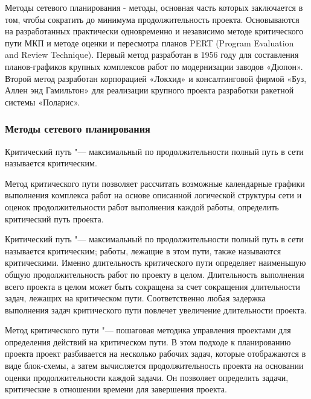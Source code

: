 \documentclass{../industrial-development}
\begin{document}
Методы сетевого планирования - методы, основная часть которых заключается в том, чтобы сократить до минимума продолжительность проекта. Основываются на разработанных практически одновременно и независимо методе критического пути МКП и методе оценки и пересмотра планов PERT (Program Evaluation and Review Technique). Первый метод разработан в 1956 году для составления планов-графиков крупных комплексов работ по модернизации заводов «Дюпон». Второй метод разработан корпорацией «Локхид» и консалтинговой фирмой «Буз, Аллен энд Гамильтон» для реализации крупного проекта разработки ракетной системы «Поларис».

    \begin{frame} \frametitle{Методы сетевого планирования}
        \begin{definition}
         Критический путь "--- максимальный по продолжительности полный путь в сети называется критическим.
        \end{definition}
        \begin{definition}
          Метод критического пути позволяет рассчитать возможные календарные графики выполнения комплекса работ на основе описанной логической структуры сети и оценок продолжительности работ выполнения каждой работы, определить критический путь проекта.
        \end{definition}
    \end{frame}
    \lecturenotes

Критический путь "--- максимальный по продолжительности полный путь в сети называется критическим; работы, лежащие в этом пути, также называются критическими. Именно длительность критического пути определяет наименьшую общую продолжительность работ по проекту в целом. Длительность выполнения всего проекта в целом может быть сокращена за счет сокращения длительности задач, лежащих на критическом пути. Соответственно любая задержка выполнения задач критического пути повлечет увеличение длительности проекта.

Метод критического пути "--- пошаговая методика управления проектами для определения действий на критическом пути. В этом подходе к планированию проекта проект разбивается на несколько рабочих задач, которые отображаются в виде блок-схемы, а затем вычисляется продолжительность проекта на основании оценки продолжительности каждой задачи. Он позволяет определить задачи, критические в отношении времени для завершения проекта.
\end{document}
